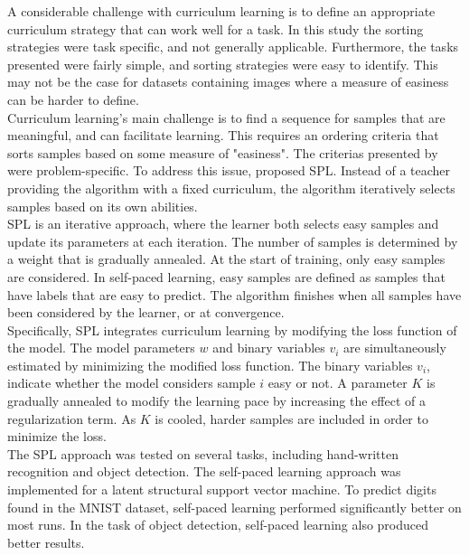 A considerable challenge with curriculum learning is to define an appropriate curriculum strategy that can work well for a task. In this study the sorting strategies were task specific, and not generally applicable. Furthermore, the tasks presented were fairly simple, and sorting strategies were easy to identify. This may not be the case for datasets containing images where a measure of easiness can be harder to define.\\


Curriculum learning's main challenge is to find a sequence for samples that are meaningful, and can facilitate learning. This requires an ordering criteria that sorts samples based on some measure of "easiness". The criterias presented by \cite{Bengio_curriculumlearning} were problem-specific. To address this issue, \cite{Kumar_self_paced_learning} proposed \ac{SPL}. Instead of a teacher providing the algorithm with a fixed curriculum, the algorithm iteratively selects samples based on its own abilities. \\

\ac{SPL} is an iterative approach, where the learner both selects easy samples and update its parameters at each iteration. The number of samples is determined by a weight that is gradually annealed. At the start of training, only easy samples are considered. In self-paced learning, easy samples are defined as samples that have labels that are easy to predict.
The algorithm finishes when all samples have been considered by the learner, or at convergence.\\

Specifically, \ac{SPL} integrates curriculum learning by modifying the loss function of the model. The model parameters $w$ and binary variables $v_{i}$ are simultaneously estimated by minimizing the modified loss function. The binary variables $v_{i}$, indicate whether the model considers sample $i$ easy or not.  A parameter $K$ is gradually annealed to modify the learning pace by increasing the effect of a regularization term. As $K$ is cooled, harder samples are included in order to minimize the loss. \\

The \ac{SPL} approach was tested on several tasks, including hand-written recognition and object detection. The self-paced learning approach was implemented for a latent structural support vector machine. To predict digits found in the MNIST dataset, self-paced learning performed significantly better on most runs. In the task of object detection, self-paced learning also produced better results.  \\

